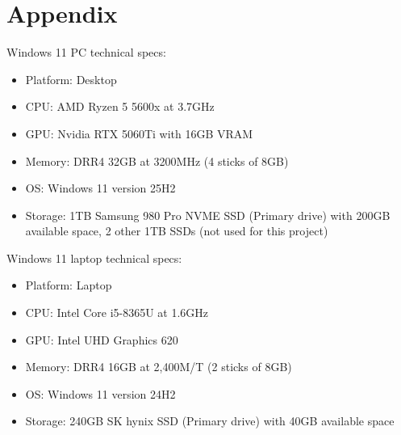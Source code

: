 \documentclass[12pt,nonacm,acmlarge,titlepage,screen]{acmart}
\begin{document}
\newpage
\appendix

\section{Appendix}

Windows 11 PC technical specs:
\begin{itemize}
	\item Platform: Desktop
	\item CPU: AMD Ryzen 5 5600x at 3.7GHz
	\item GPU: Nvidia RTX 5060Ti with 16GB VRAM
	\item Memory: DRR4 32GB at 3200MHz (4 sticks of 8GB)
	\item OS: Windows 11 version 25H2
	\item Storage: 1TB Samsung 980 Pro NVME SSD (Primary drive) with 200GB available space, 2 other 1TB SSDs (not used for this project)
\end{itemize}

Windows 11 laptop technical specs:
\begin{itemize}
	\item Platform: Laptop
	\item CPU: Intel Core i5-8365U at 1.6GHz
	\item GPU: Intel UHD Graphics 620
	\item Memory: DRR4 16GB at 2,400M/T (2 sticks of 8GB)
	\item OS: Windows 11 version 24H2
	\item Storage: 240GB SK hynix SSD (Primary drive) with 40GB available space
\end{itemize}

\end{document}
